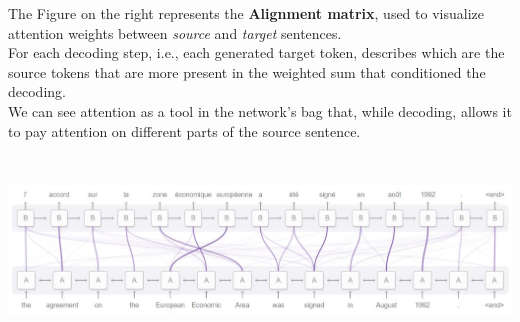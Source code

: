 
The Figure on the right represents the \textbf{Alignment matrix}, used to visualize attention weights between \textit{source} and \textit{target} sentences. \\
For each decoding step, i.e., each generated target token, describes which are the source tokens that are more present in the weighted sum that conditioned the decoding. \\
We can see attention as a tool in the network’s bag that, while decoding, allows it to pay attention on different parts of the source sentence.

\begin{minipage}{\linewidth}
        \centering
        \hspace*{-2cm}    
        \includegraphics[width=17cm, height=5cm]{images/attention_example_french.png}
\end{minipage} \\

